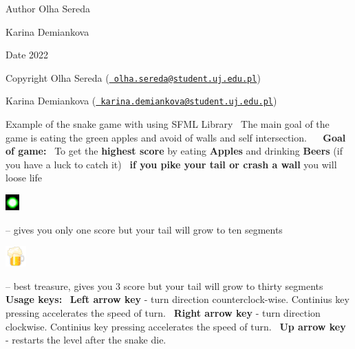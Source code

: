 \begin{DoxyAuthor}{Author}
Olha Sereda 

Karina Demiankova 
\end{DoxyAuthor}
\begin{DoxyDate}{Date}
2022 
\end{DoxyDate}
\begin{DoxyCopyright}{Copyright}
Olha Sereda (\href{mailto:olha.sereda@student.uj.edu.pl}{\texttt{ olha.\+sereda@student.\+uj.\+edu.\+pl}}) 

Karina Demiankova (\href{mailto:karina.demiankova@student.uj.edu.pl}{\texttt{ karina.\+demiankova@student.\+uj.\+edu.\+pl}})
\end{DoxyCopyright}
Example of the snake game with using SFML Library~\newline
The main goal of the game is eating the green apples and avoid of walls and self intersection.~\newline
~\newline
{\bfseries{Goal of game\+:}}~\newline
To get the {\bfseries{highest score}} by eating {\bfseries{Apples}} and drinking {\bfseries{Beers}} (if you have a luck to catch it)~\newline
{\bfseries{if you pike your tail or crash a wall}} you will loose life~\newline
 ~\newline
 
\begin{DoxyInlineImage}
\includegraphics[height=\baselineskip,keepaspectratio=true]{apple.png}%
\end{DoxyInlineImage}
    -- gives you only one score but your tail will grow to ten segments~\newline
 
\begin{DoxyInlineImage}
\includegraphics[height=\baselineskip,keepaspectratio=true]{beer-icon.png}%
\end{DoxyInlineImage}
    -- best treasure, gives you 3 score but your tail will grow to thirty segments~\newline
~\newline
{\bfseries{Usage keys\+:}}~\newline
{\bfseries{Left arrow key}} -\/ turn direction counterclock-\/wise. Continius key pressing accelerates the speed of turn.~\newline
{\bfseries{Right arrow key}} -\/ turn direction clockwise. Continius key pressing accelerates the speed of turn.~\newline
{\bfseries{Up arrow key}} -\/ restarts the level after the snake die.~\newline
~\newline
 
